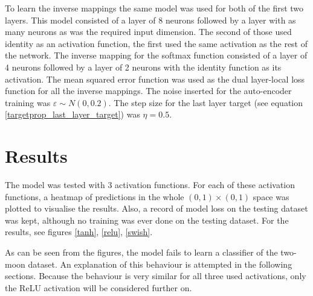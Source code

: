 To learn the inverse mappings the same model was used for both of the first two layers. This model consisted of a layer of 8 neurons followed by a layer with as many neurons as was the required input dimension. The second of those used identity as an activation function, the first used the same activation as the rest of the network. The inverse mapping for the softmax function consisted of a layer of 4 neurons followed by a layer of 2 neurons with the identity function as its activation. The mean squared error function was used as the dual layer-local loss function for all the inverse mappings. The noise inserted for the auto-encoder training was \( \varepsilon \sim N \left( 0, 0.2 \right) \). The step size for the last layer target (see equation \ref{targetprop_last_layer_target}) was \( \eta = 0.5 \).

\section{Results}

The model was tested with 3 activation functions. For each of these activation functions, a heatmap of predictions in the whole \( \left( 0, 1 \right) \times \left( 0, 1 \right) \) space was plotted to visualise the results. Also, a record of model loss on the testing dataset was kept, although no training was ever done on the testing dataset. For the results, see figures \ref{tanh}, \ref{relu}, \ref{swish}. 

As can be seen from the figures, the model fails to learn a classifier of the two-moon dataset.  An explanation of this behaviour is attempted in the following sections. Because the behaviour is very similar for all three used activations, only the ReLU activation will be considered further on.

